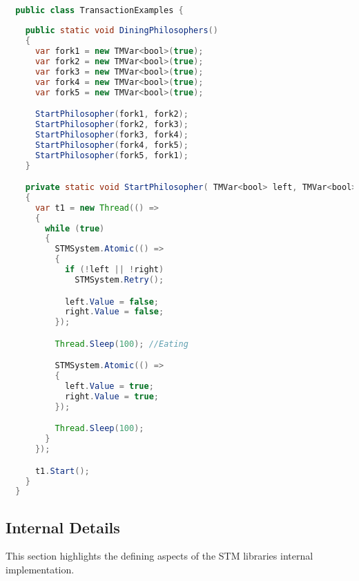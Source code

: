 \begin{lstlisting}[label=lst:library_dinning,
  caption={Library Dining Philosophers},
  language=Java,  
  showspaces=false,
  showtabs=false,
  breaklines=true,
  showstringspaces=false,
  breakatwhitespace=true,
  commentstyle=\color{greencomments},
  keywordstyle=\color{bluekeywords},
  stringstyle=\color{redstrings},
  morekeywords={atomic, retry, orElse, var, get, set}]  % Start your code-block

  public class TransactionExamples {
    
    public static void DiningPhilosophers()
    {
      var fork1 = new TMVar<bool>(true);
      var fork2 = new TMVar<bool>(true);
      var fork3 = new TMVar<bool>(true);
      var fork4 = new TMVar<bool>(true);
      var fork5 = new TMVar<bool>(true);

      StartPhilosopher(fork1, fork2);
      StartPhilosopher(fork2, fork3);
      StartPhilosopher(fork3, fork4);
      StartPhilosopher(fork4, fork5);
      StartPhilosopher(fork5, fork1);
    }

    private static void StartPhilosopher( TMVar<bool> left, TMVar<bool> right)
    {
      var t1 = new Thread(() =>
      {
        while (true)
        {
          STMSystem.Atomic(() =>
          {
            if (!left || !right)
              STMSystem.Retry();

            left.Value = false;
            right.Value = false;
          });

          Thread.Sleep(100); //Eating

          STMSystem.Atomic(() =>
          {
            left.Value = true;
            right.Value = true;
          });

          Thread.Sleep(100);
        }
      });

      t1.Start();
    }
  }
\end{lstlisting}

\subsection{Internal Details}
\label{sec:stm_impl_internal_detials}
This section highlights the defining aspects of the \ac{STM} libraries internal implementation.
